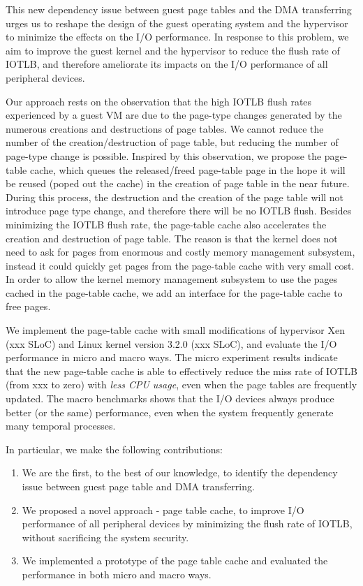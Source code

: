 
This new dependency issue between guest page tables and the DMA transferring urges us to reshape the design of the guest operating system and the hypervisor to minimize the effects on the I/O performance.
In response to this problem, we aim to improve the guest kernel and the hypervisor to reduce the flush rate of IOTLB, and therefore ameliorate its impacts on the I/O performance of all peripheral devices.

Our approach rests on the observation that the high IOTLB flush rates experienced by a guest VM
are due to the page-type changes generated by the numerous creations and destructions of page tables.
We cannot reduce the number of the creation/destruction of page table, but reducing the number of page-type change is possible.
Inspired by this observation, we propose the page-table cache, which queues the released/freed page-table page in the hope
it will be reused (poped out the cache) in the creation of page table in the near future.
During this process, the destruction and the creation of the page table will not introduce page type change, and therefore there will be no IOTLB flush.
Besides minimizing the IOTLB flush rate, the page-table cache also accelerates the creation and destruction of page table.
The reason is that the kernel does not need to ask for pages from enormous and costly memory management subsystem, instead it could quickly get pages from the page-table cache with very small cost.
In order to allow the kernel memory management subsystem to use the pages cached in the page-table cache, we add an interface for the page-table cache to free pages.

We implement the page-table cache with small modifications of hypervisor Xen (xxx SLoC)  and Linux kernel version 3.2.0 (xxx SLoC), and evaluate the I/O performance in micro and macro ways.
The micro experiment results indicate that the new page-table cache is able to effectively reduce the miss rate of IOTLB (from xxx to zero) with \emph{less CPU usage}, even when the page tables are frequently updated.
The macro benchmarks shows that the I/O devices always produce better (or the same) performance, even when the system frequently generate many temporal processes.


In particular, we make the following contributions:
\begin{enumerate}
\item We are the first, to the best of our knowledge, to identify the dependency issue between guest page table and DMA transferring.
\item We proposed a novel approach - page table cache, to improve I/O performance of all peripheral devices by minimizing the flush rate of IOTLB, without sacrificing the system security.
\item We implemented a prototype of the page table cache and evaluated the performance in both micro and macro ways.
\end{enumerate}

